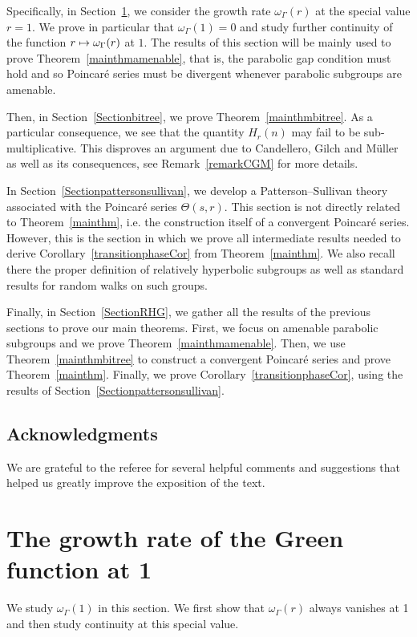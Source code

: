 \documentclass[AHL,Unicode,longabstracts]{cedram}
\let\oldmapsto\mapsto
\renewcommand*{\mapsto}{\mathchoice{\longmapsto}{\oldmapsto}{\oldmapsto}{\oldmapsto}}
\begin{document}
Specifically, in Section~\ref{Sectiongrowthrateat1}, we consider the growth rate $\omega_\Gamma(r)$ at the special value $r=1$. We prove in particular that $\omega_\Gamma(1)=0$ and study further continuity of the function $r\mapsto \omega_\Gamma(r)$ at $1$. The results of this section will be mainly used to prove Theorem~\ref{mainthmamenable}, that is, the parabolic gap condition must hold and so Poincaré series must be divergent whenever parabolic subgroups are amenable.

Then, in Section~\ref{Sectionbitree}, we prove Theorem~\ref{mainthmbitree}. As a particular consequence, we see that the quantity $H_r(n)$ may fail to be sub-multiplicative. This disproves an argument due to Candellero, Gilch and Müller~\cite{CandelleroGilchMuller} as well as its consequences, see Remark~\ref{remarkCGM} for more details.

In Section~\ref{Sectionpattersonsullivan}, we develop a Patterson--Sullivan theory associated with the Poincaré series $\Theta(s,r)$. This section is not directly related to Theorem~\ref{mainthm}, i.e. the construction itself of a convergent Poincaré series. However, this is the section in which we prove all intermediate results needed to derive Corollary~\ref{transitionphaseCor} from Theorem~\ref{mainthm}. We also recall there the proper definition of relatively hyperbolic subgroups as well as standard results for random walks on such groups.

Finally, in Section~\ref{SectionRHG}, we gather all the results of the previous sections to prove our main theorems. First, we focus on amenable parabolic subgroups and we prove Theorem~\ref{mainthmamenable}. Then, we use Theorem~\ref{mainthmbitree} to construct a convergent Poincaré series and prove Theorem~\ref{mainthm}. Finally, we prove Corollary~\ref{transitionphaseCor}, using the results of Section~\ref{Sectionpattersonsullivan}.

\subsection*{Acknowledgments}
We are grateful to the referee for several helpful comments and suggestions that helped us greatly improve the exposition of the text.



\section{The growth rate of the Green function at 1}
\label{Sectiongrowthrateat1}
We study $\omega_\Gamma(1)$ in this section. We first show that $\omega_\Gamma(r)$ always vanishes at 1 and then study continuity at this special value.
\end{document}
